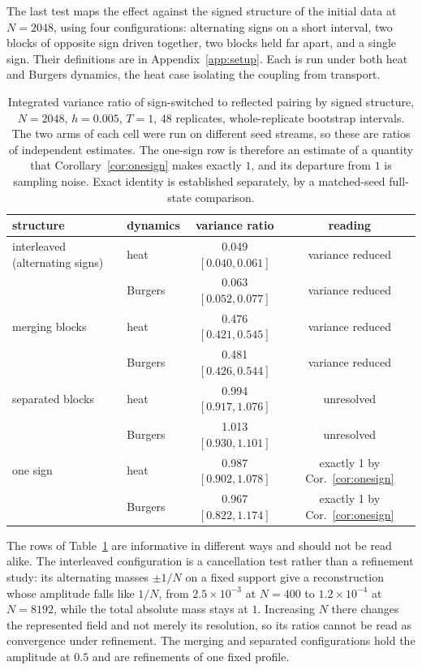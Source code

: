 \documentclass[smallextended,nospthms]{svjour3}
\theoremstyle{plain}
\theoremstyle{definition}
\theoremstyle{remark}
\numberwithin{equation}{section}
\begin{document}
The last test maps the effect against the signed structure of the initial data
at $N=2048$, using four configurations: alternating signs on a short interval,
two blocks of opposite sign driven together, two blocks held far apart, and a
single sign. Their definitions are in Appendix~\ref{app:setup}. Each is run
under both heat and Burgers dynamics, the heat case isolating the coupling from
transport.

\begin{table}[htbp]
\centering
\caption{Integrated variance ratio of sign-switched to reflected pairing by
signed structure, $N=2048$, $h=0.005$, $T=1$, $48$ replicates, whole-replicate
bootstrap intervals. The two arms of each cell were run on different seed
streams, so these are ratios of independent estimates. The one-sign row is
therefore an estimate of a quantity that Corollary~\ref{cor:onesign} makes
exactly $1$, and its departure from $1$ is sampling noise. Exact identity is
established separately, by a matched-seed full-state comparison.}
\label{tab:structure}
\small
\setlength{\tabcolsep}{3pt}
\begin{tabular}{llcc}
\toprule
structure & dynamics & variance ratio & reading\\
\midrule
interleaved (alternating signs) & heat    & 0.049 $[0.040,0.061]$ & variance reduced\\
                                & Burgers & 0.063 $[0.052,0.077]$ & variance reduced\\
merging blocks                  & heat    & 0.476 $[0.421,0.545]$ & variance reduced\\
                                & Burgers & 0.481 $[0.426,0.544]$ & variance reduced\\
separated blocks                & heat    & 0.994 $[0.917,1.076]$ & unresolved\\
                                & Burgers & 1.013 $[0.930,1.101]$ & unresolved\\
one sign                        & heat    & 0.987 $[0.902,1.078]$ & exactly 1 by Cor.~\ref{cor:onesign}\\
                                & Burgers & 0.967 $[0.822,1.174]$ & exactly 1 by Cor.~\ref{cor:onesign}\\
\bottomrule
\end{tabular}
\end{table}

The rows of Table~\ref{tab:structure} are informative in different ways and
should not be read alike. The interleaved configuration is a cancellation test
rather than a refinement study: its alternating masses $\pm1/N$ on a fixed
support give a reconstruction whose amplitude falls like $1/N$, from
$2.5\times10^{-3}$ at $N=400$ to $1.2\times10^{-4}$ at $N=8192$, while the
total absolute mass stays at $1$. Increasing $N$ there changes the represented
field and not merely its resolution, so its ratios cannot be read as
convergence under refinement. The merging and separated configurations hold the
amplitude at $0.5$ and are refinements of one fixed profile.
\end{document}
